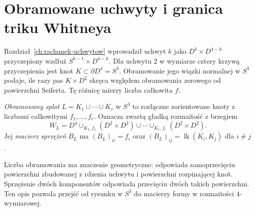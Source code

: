 \section{Obramowane uchwyty i granica triku Whitneya}
\label{sec:freedman-handles}

Rozdział~\ref{ch:rachunek-uchwytow} wprowadził uchwyt
$k$ jako $D^k\times D^{4-k}$ przyczepiony wzdłuż
$S^{k-1}\times D^{4-k}$. Dla uchwytu $2$ w wymiarze
cztery krzywą przyczepienia jest knot
$K\subset\partial D^4=S^3$. Obramowanie jego wiązki
normalnej w $S^3$ podaje, ile razy pas $K\times D^2$
skręca względem obramowania zerowego od powierzchni
Seiferta. Tę różnicę mierzy liczba całkowita $f$.

\begin{definicja}
\label{def:freedman-framed-link}
\emph{Obramowany splot} $L=K_1\cup\cdots\cup K_r$
w $S^3$ to rozłączne zorientowane knoty z liczbami
całkowitymi $f_1,\ldots,f_r$. Oznacza zwartą gładką
rozmaitość z brzegiem
\[
 W_L=D^4\cup_{K_1,f_1}(D^2\times D^2)
       \cup\cdots\cup_{K_r,f_r}(D^2\times D^2).
\]
Jej \emph{macierz sprzężeń} $B_L$ ma
$(B_L)_{ii}=f_i$ oraz
$(B_L)_{ij}=\operatorname{lk}(K_i,K_j)$ dla $i\ne j$.
\end{definicja}

Liczba obramowania ma znaczenie geometryczne:
odpowiada samoprzecięciu powierzchni zbudowanej z rdzenia
uchwytu i powierzchni rozpinającej knot. Sprzężenie
dwóch komponentów odpowiada przecięciu dwóch takich
powierzchni. Ten opis pozwala przejść od rysunku w $S^3$
do macierzy formy w rozmaitości $4$-wymiarowej.

